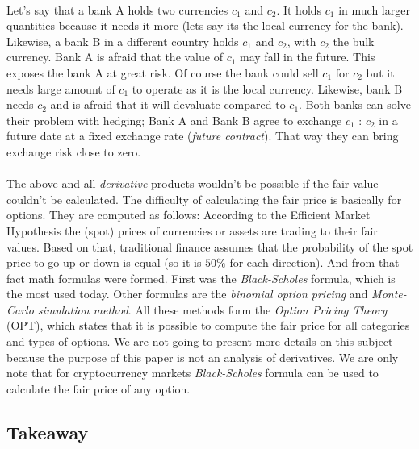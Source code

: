 \documentclass{article}
\begin{document}
\paragraph{ }
Let's say that a bank A holds two currencies $c_{1}$ and $c_{2}$. It holds $c_{1}$ in much larger quantities because it needs it more (lets say its the local currency for the bank). Likewise, a bank B in a different country holds $c_{1}$ and $c_{2}$, with $c_{2}$ the bulk currency. Bank A is afraid that the value of $c_{1}$ may fall in the future. This exposes the bank A at great risk. Of course the bank could sell $c_{1}$ for $c_{2}$ but it needs large amount of $c_{1}$ to operate as it is the local currency. Likewise, bank B needs $c_{2}$ and is afraid that it will devaluate compared to $c_{1}$. Both banks can solve their problem with hedging; Bank A and Bank B agree to exchange $c_{1}$ : $c_{2}$ in a future date at a fixed exchange rate (\emph{future contract}). That way they can bring exchange risk close to zero.
\paragraph{ }
The above and all \emph{derivative} products wouldn't be possible if the fair value couldn't be calculated. The difficulty of calculating the fair price is basically for options. They are computed as follows: According to the Efficient Market Hypothesis the (spot) prices of currencies or assets are trading to their fair values. Based on that, traditional finance assumes that the probability of the spot price to go up or down is equal (so it is $50\%$ for each direction). And from that fact math formulas were formed. First was the \emph{Black-Scholes} formula, which is the most used today. Other formulas are the \emph{binomial option pricing} and \emph{Monte-Carlo simulation method}. All these methods form the \emph{Option Pricing Theory} (OPT), which states that it is possible to compute the fair price for all categories and types of options. We are not going to present more details on this subject because the purpose of this paper is not an analysis of derivatives. We are only note that for cryptocurrency markets \emph{Black-Scholes} formula can be used to calculate the fair price of any option.

\subsection{Takeaway}
\end{document}
